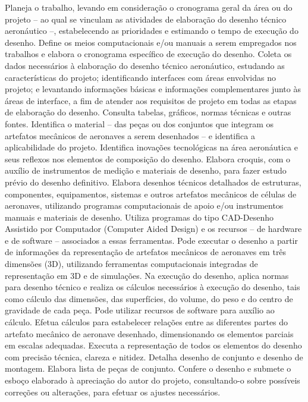 \documentclass[
]{article}
\begin{document}
Planeja o trabalho, levando em consideração o cronograma geral da área
ou do projeto -- ao qual se vinculam as atividades de elaboração do
desenho técnico aeronáutico --, estabelecendo as prioridades e estimando
o tempo de execução do desenho. Define os meios computacionais e/ou
manuais a serem empregados nos trabalhos e elabora o cronograma
específico de execução do desenho. Coleta os dados necessários à
elaboração do desenho técnico aeronáutico, estudando as características
do projeto; identificando interfaces com áreas envolvidas no projeto; e
levantando informações básicas e informações complementares junto às
áreas de interface, a fim de atender aos requisitos de projeto em todas
as etapas de elaboração do desenho. Consulta tabelas, gráficos, normas
técnicas e outras fontes. Identifica o material -- das peças ou dos
conjuntos que integram os artefatos mecânicos de aeronaves a serem
desenhados -- e identifica a aplicabilidade do projeto. Identifica
inovações tecnológicas na área aeronáutica e seus reflexos nos elementos
de composição do desenho. Elabora croquis, com o auxílio de instrumentos
de medição e materiais de desenho, para fazer estudo prévio do desenho
definitivo. Elabora desenhos técnicos detalhados de estruturas,
componentes, equipamentos, sistemas e outros artefatos mecânicos de
células de aeronaves, utilizando programas computacionais de apoio e/ou
instrumentos manuais e materiais de desenho. Utiliza programas do tipo
CAD-Desenho Assistido por Computador (Computer Aided Design) e os
recursos -- de hardware e de software -- associados a essas ferramentas.
Pode executar o desenho a partir de informações da representação de
artefatos mecânicos de aeronaves em três dimensões (3D), utilizando
ferramentas computacionais integradas de representação em 3D e de
simulações. Na execução do desenho, aplica normas para desenho técnico e
realiza os cálculos necessários à execução do desenho, tais como cálculo
das dimensões, das superfícies, do volume, do peso e do centro de
gravidade de cada peça. Pode utilizar recursos de software para auxílio
ao cálculo. Efetua cálculos para estabelecer relações entre as
diferentes partes do artefato mecânico de aeronave desenhado,
dimensionando os elementos parciais em escalas adequadas. Executa a
representação de todos os elementos do desenho com precisão técnica,
clareza e nitidez. Detalha desenho de conjunto e desenho de montagem.
Elabora lista de peças de conjunto. Confere o desenho e submete o esboço
elaborado à apreciação do autor do projeto, consultando-o sobre
possíveis correções ou alterações, para efetuar os ajustes necessários.
\end{document}
